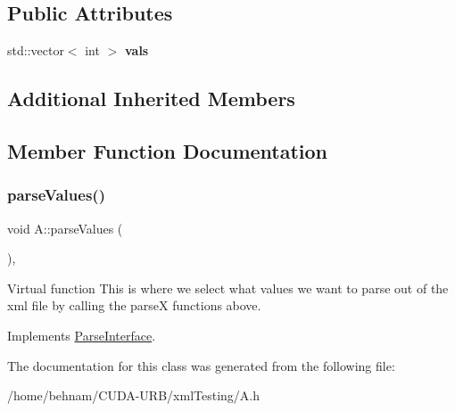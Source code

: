 \subsection*{Public Attributes}
\begin{DoxyCompactItemize}
\item 
\mbox{\label{classA_a2c26c82449219058c4df497d87a20403}} 
std\+::vector$<$ int $>$ {\bfseries vals}
\end{DoxyCompactItemize}
\subsection*{Additional Inherited Members}


\subsection{Member Function Documentation}
\mbox{\label{classA_a71896ec8a87fd03a725668c503ec64e7}} 
\subsubsection{\texorpdfstring{parse\+Values()}{parseValues()}}
{\footnotesize\ttfamily void A\+::parse\+Values (\begin{DoxyParamCaption}{ }\end{DoxyParamCaption})\hspace{0.3cm}{\ttfamily [inline]}, {\ttfamily [virtual]}}

Virtual function This is where we select what values we want to parse out of the xml file by calling the parseX functions above. 

Implements \hyperlink{classParseInterface_afca32108192ba0997c9e5a78189b0cbc}{Parse\+Interface}.



The documentation for this class was generated from the following file\+:\begin{DoxyCompactItemize}
\item 
/home/behnam/\+C\+U\+D\+A-\/\+U\+R\+B/xml\+Testing/A.\+h\end{DoxyCompactItemize}
